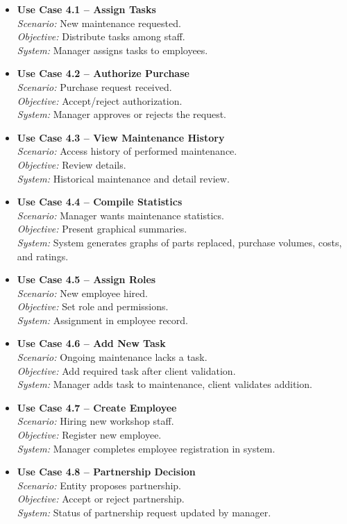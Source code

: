 \begin{itemize}
    \item \textbf{Use Case 4.1 – Assign Tasks}\\
    \textit{Scenario:} New maintenance requested.\\
    \textit{Objective:} Distribute tasks among staff.\\
    \textit{System:} Manager assigns tasks to employees.
    \item \textbf{Use Case 4.2 – Authorize Purchase}\\
    \textit{Scenario:} Purchase request received.\\
    \textit{Objective:} Accept/reject authorization.\\
    \textit{System:} Manager approves or rejects the request.
    \item \textbf{Use Case 4.3 – View Maintenance History}\\
    \textit{Scenario:} Access history of performed maintenance.\\
    \textit{Objective:} Review details.\\
    \textit{System:} Historical maintenance and detail review.
    \item \textbf{Use Case 4.4 – Compile Statistics}\\
    \textit{Scenario:} Manager wants maintenance statistics.\\
    \textit{Objective:} Present graphical summaries.\\
    \textit{System:} System generates graphs of parts replaced, purchase volumes, costs, and ratings.
    \item \textbf{Use Case 4.5 – Assign Roles}\\
    \textit{Scenario:} New employee hired.\\
    \textit{Objective:} Set role and permissions.\\
    \textit{System:} Assignment in employee record.
    \item \textbf{Use Case 4.6 – Add New Task}\\
    \textit{Scenario:} Ongoing maintenance lacks a task.\\
    \textit{Objective:} Add required task after client validation.\\
    \textit{System:} Manager adds task to maintenance, client validates addition.
    \item \textbf{Use Case 4.7 – Create Employee}\\
    \textit{Scenario:} Hiring new workshop staff.\\
    \textit{Objective:} Register new employee.\\
    \textit{System:} Manager completes employee registration in system.
    \item \textbf{Use Case 4.8 – Partnership Decision}\\
    \textit{Scenario:} Entity proposes partnership.\\
    \textit{Objective:} Accept or reject partnership.\\
    \textit{System:} Status of partnership request updated by manager.
\end{itemize}

